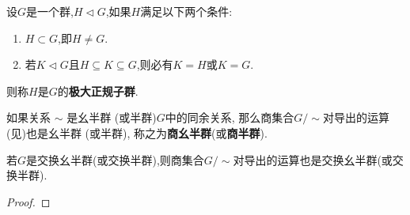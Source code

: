 \documentclass[../../main.tex]{subfiles}%
\begin{document}
\begin{definition}[极大正规子群]
设$G$是一个群,$H\lhd G$,如果$H$满足以下两个条件:
\begin{enumerate}[(1)]
\item $H\subset G$,即$H\neq G$.

\item 若$K\lhd G$且$H\subseteq K\subseteq G$,则必有$K=H$或$K=G$.
\end{enumerate}
则称$H$是$G$的\textbf{极大正规子群}.
\end{definition}

\begin{theorem}\label{theorem:抽象代数--半群中的同余关系可导出商集合也是商半群}
如果关系 \( \sim \) 是幺半群 (或半群)$G$中的同余关系, 那么商集合$G/\sim$对导出的运算(见)也是幺半群 (或半群), 称之为\textbf{商幺半群}(或\textbf{商半群}). 

若$G$是交换幺半群(或交换半群),则商集合$G/\sim$对导出的运算也是交换幺半群(或交换半群).
\end{theorem}
\begin{proof}

\end{proof}
\end{document}

